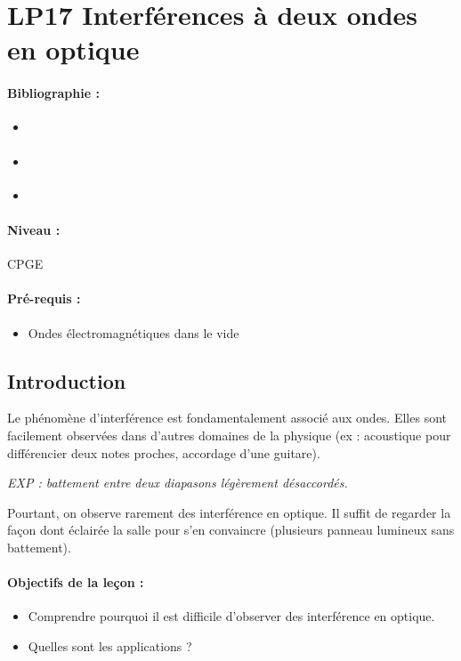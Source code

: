 \section{LP17 Interférences à deux ondes en optique}

\paragraph{Bibliographie :}
\begin{itemize}
\item \cite{Faroux1999}
\item \cite{Perez2017}
\item \cite{BFROptique}
\end{itemize}

\paragraph{Niveau :} CPGE

\paragraph{Pré-requis :}
\begin{itemize}
\item Ondes électromagnétiques dans le vide
\end{itemize}

\subsection{Introduction}

Le phénomène d'interférence est fondamentalement associé aux ondes.
Elles sont facilement observées dans d'autres domaines de la physique (ex : acoustique pour différencier deux notes proches, accordage d'une guitare).

\emph{EXP : battement entre deux diapasons légèrement désaccordés.}

Pourtant, on observe rarement des interférence en optique.
Il suffit de regarder la façon dont éclairée la salle pour s'en convaincre (plusieurs panneau lumineux sans battement).

\paragraph{Objectifs de la leçon :}
\begin{itemize}
\item Comprendre pourquoi il est difficile d'observer des interférence en optique.
\item Quelles sont les applications ?
\end{itemize}


